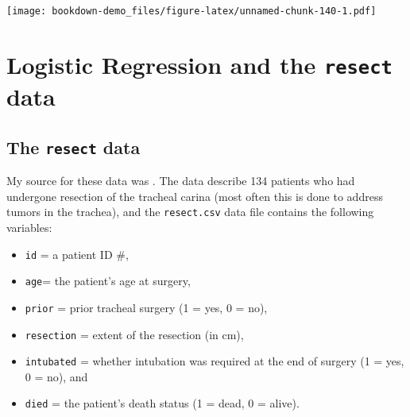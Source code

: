 \documentclass[]{book}
\newenvironment{Shaded}{\begin{snugshade}}{\end{snugshade}}
\newcommand{\KeywordTok}[1]{\textcolor[rgb]{0.13,0.29,0.53}{\textbf{#1}}}
\newcommand{\StringTok}[1]{\textcolor[rgb]{0.31,0.60,0.02}{#1}}
\newcommand{\OperatorTok}[1]{\textcolor[rgb]{0.81,0.36,0.00}{\textbf{#1}}}
\newcommand{\NormalTok}[1]{#1}
\providecommand{\tightlist}{%
  \setlength{\itemsep}{0pt}\setlength{\parskip}{0pt}}
\theoremstyle{definition}
\theoremstyle{definition}
\theoremstyle{definition}
\theoremstyle{remark}
\begin{document}
\texttt{[image: bookdown-demo\_files/figure-latex/unnamed-chunk-140-1.pdf]}

\chapter{\texorpdfstring{Logistic Regression and the \texttt{resect}
data}{Logistic Regression and the resect data}}\label{logistic-regression-and-the-resect-data}

\section{\texorpdfstring{The \texttt{resect}
data}{The resect data}}\label{the-resect-data}

My source for these data was \citet{Riffenburgh2006}. The data describe
134 patients who had undergone resection of the tracheal carina (most
often this is done to address tumors in the trachea), and the
\texttt{resect.csv} data file contains the following variables:

\begin{itemize}
\tightlist
\item
  \texttt{id} = a patient ID \#,
\item
  \texttt{age}= the patient's age at surgery,
\item
  \texttt{prior} = prior tracheal surgery (1 = yes, 0 = no),
\item
  \texttt{resection} = extent of the resection (in cm),
\item
  \texttt{intubated} = whether intubation was required at the end of
  surgery (1 = yes, 0 = no), and
\item
  \texttt{died} = the patient's death status (1 = dead, 0 = alive).
\end{itemize}

\begin{Shaded}
\end{Shaded}
\end{document}
